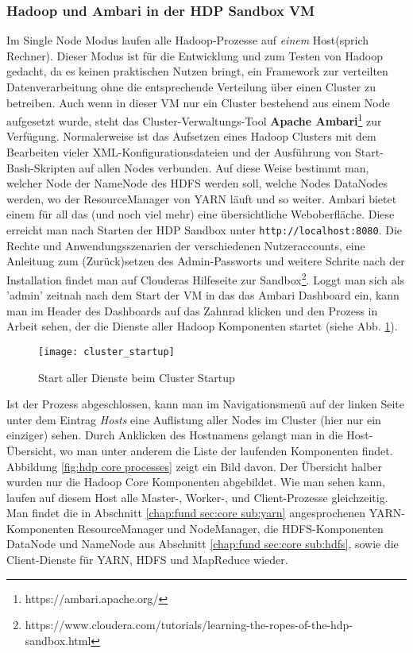 \subsubsection*{Hadoop und Ambari in der HDP Sandbox VM}
Im Single Node Modus laufen alle Hadoop-Prozesse auf \textit{einem} Host(sprich Rechner). Dieser Modus ist für die Entwicklung und zum Testen von Hadoop gedacht, da es keinen praktischen Nutzen bringt, ein Framework zur verteilten Datenverarbeitung ohne die entsprechende Verteilung über einen Cluster zu betreiben. Auch wenn in dieser VM nur ein Cluster bestehend aus einem Node aufgesetzt wurde, steht das Cluster-Verwaltungs-Tool \textbf{Apache Ambari}\footnote{https://ambari.apache.org/} zur Verfügung. Normalerweise ist das Aufsetzen eines Hadoop Clusters mit dem Bearbeiten vieler XML-Konfigurationsdateien und der Ausführung von Start-Bash-Skripten auf allen Nodes verbunden. Auf diese Weise bestimmt man, welcher Node der NameNode des HDFS werden soll, welche Nodes DataNodes werden, wo der ResourceManager von YARN läuft und so weiter. Ambari bietet einem für all das (und noch viel mehr) eine übersichtliche Weboberfläche. Diese erreicht man nach Starten der HDP Sandbox unter \verb|http://localhost:8080|. Die Rechte und Anwendungsszenarien der verschiedenen Nutzeraccounts, eine Anleitung zum (Zurück)setzen des Admin-Passworts und weitere Schrite nach der Installation findet man auf Clouderas Hilfeseite zur Sandbox\footnote{https://www.cloudera.com/tutorials/learning-the-ropes-of-the-hdp-sandbox.html}. Loggt man sich als 'admin' zeitnah nach dem Start der VM in das das Ambari Dashboard ein, kann man im Header des Dashboards auf das Zahnrad klicken und den Prozess in Arbeit sehen, der die Dienste aller Hadoop Komponenten startet (siehe Abb. \ref{fig:cluster startup}). 

\begin{figure}[ht]
    \centering
    \texttt{[image: cluster\_startup]}
    \caption[Start aller Prozesse beim Cluster Startup]{Start aller Dienste beim Cluster Startup}
    \label{fig:cluster startup}
\end{figure}

Ist der Prozess abgeschlossen, kann man im Navigationsmenü auf der linken Seite unter dem Eintrag \textit{Hosts} eine Auflistung aller Nodes im Cluster (hier nur ein einziger) sehen. Durch Anklicken des Hostnamens gelangt man in die Host-Übersicht, wo man unter anderem die Liste der laufenden Komponenten findet. Abbildung \ref{fig:hdp core processes} zeigt ein Bild davon. Der Übersicht halber wurden nur die Hadoop Core Komponenten abgebildet. Wie man sehen kann, laufen auf diesem Host alle Master-, Worker-, und Client-Prozesse gleichzeitig. Man findet die in Abschnitt \ref{chap:fund sec:core sub:yarn} angesprochenen YARN-Komponenten ResourceManager und NodeManager, die HDFS-Komponenten DataNode und NameNode aus Abschnitt \ref{chap:fund sec:core sub:hdfs}, sowie die Client-Dienste für YARN, HDFS und MapReduce wieder. 

